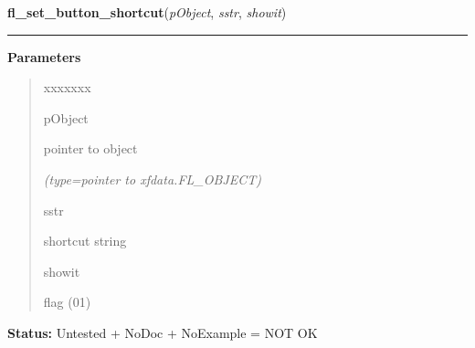 \hspace{.8\funcindent}\begin{boxedminipage}{\funcwidth}

    \raggedright \textbf{fl\_set\_button\_shortcut}(\textit{pObject}, \textit{sstr}, \textit{showit})

    \vspace{-1.5ex}

    \rule{\textwidth}{0.5\fboxrule}
\setlength{\parskip}{2ex}
\setlength{\parskip}{1ex}
      \textbf{Parameters}
      \vspace{-1ex}

      \begin{quote}
        \begin{Ventry}{xxxxxxx}

          \item[pObject]

          pointer to object

            {\it (type=pointer to xfdata.FL\_OBJECT)}

          \item[sstr]

          shortcut string

          \item[showit]

          flag (0{\textbar}1)

        \end{Ventry}

      \end{quote}

\textbf{Status:} Untested + NoDoc + NoExample = NOT OK



    \end{boxedminipage}

    \label{xformslib:library:fl_create_generic_button}

    \vspace{0.5ex}

